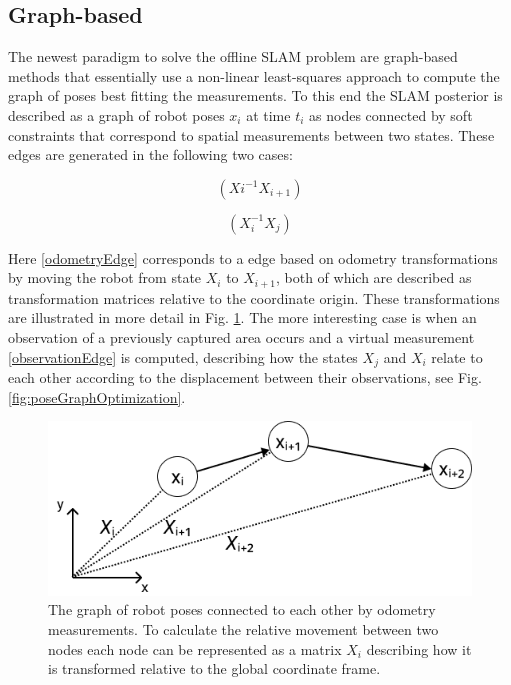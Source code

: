 \subsection{Graph-based}
The newest paradigm to solve the offline SLAM problem are graph-based methods that essentially use a non-linear least-squares approach to compute the graph of poses best fitting the measurements. 
To this end the SLAM posterior is described as a graph of robot poses $ x_{i} $ at time $ t_{i} $ as nodes connected by soft constraints that correspond to spatial measurements between two states.
These edges are generated in the following two cases:

\begin{equation}\label{odometryEdge}
	(X{i}^{-1}X_{i+1})
\end{equation}

\begin{equation}\label{observationEdge}
	(X_{i}^{-1}X_{j})
\end{equation}

Here \ref{odometryEdge} corresponds to a edge based on odometry transformations by moving the robot from state $X_{i}$ to $X_{i+1}$, both of which are described as transformation matrices relative to the coordinate origin.
These transformations are illustrated in more detail in Fig. \ref{fig:poseGraphTransformation}.
The more interesting case is when an observation of a previously captured area occurs and a virtual measurement \ref{observationEdge} is computed, describing how the states $X_{j}$ and $X_{i}$ relate to each other according to the displacement between their observations, see Fig. \ref{fig:poseGraphOptimization}.

\begin{figure}
	\centering
	\includegraphics[width=0.6\linewidth]{img/PoseGraphTransformation}
	\caption{
		The graph of robot poses connected to each other by odometry measurements. To calculate the relative movement between two nodes each node can be represented as a matrix $X_{i}$ describing how it is transformed relative to the global coordinate frame.
	}
	\label{fig:poseGraphTransformation}
\end{figure}



